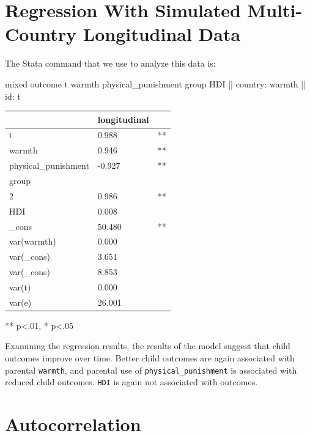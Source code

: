 \documentclass[
  letterpaper,
  DIV=11,
  numbers=noendperiod]{scrreprt}
\newenvironment{Shaded}{\begin{snugshade}}{\end{snugshade}}
\newcommand{\FunctionTok}[1]{\textcolor[rgb]{0.28,0.35,0.67}{#1}}
\newcommand{\NormalTok}[1]{\textcolor[rgb]{0.00,0.23,0.31}{#1}}
\begin{document}
\hypertarget{sec-regressionlongitudinal}{%
\section{Regression With Simulated Multi-Country Longitudinal
Data}\label{sec-regressionlongitudinal}}

The Stata command that we use to analyze this data is:

\begin{Shaded}
\begin{Highlighting}[]

\NormalTok{mixed outcome t warmth physical\_punishment }\FunctionTok{group}\NormalTok{ HDI || country: warmth || id: t}
\end{Highlighting}
\end{Shaded}

\begin{longtable}[]{@{}lll@{}}
\toprule()
& longitudinal & \\
\midrule()
\endhead
t & 0.988 & ** \\
warmth & 0.946 & ** \\
physical\_punishment & -0.927 & ** \\
group & & \\
2 & 0.986 & ** \\
HDI & 0.008 & \\
\_cons & 50.480 & ** \\
var(warmth) & 0.000 & \\
var(\_cons) & 3.651 & \\
var(\_cons) & 8.853 & \\
var(t) & 0.000 & \\
var(e) & 26.001 & \\
\bottomrule()
\end{longtable}

** p\textless.01, * p\textless.05

Examining the regression results, the results of the model suggest that
child outcomes improve over time. Better child outcomes are again
associated with parental \texttt{warmth}, and parental use of
\texttt{physical\_punishment} is associated with reduced child outcomes.
\texttt{HDI} is again not associated with outcomes.

\hypertarget{autocorrelation}{%
\section{Autocorrelation}\label{autocorrelation}}
\end{document}
